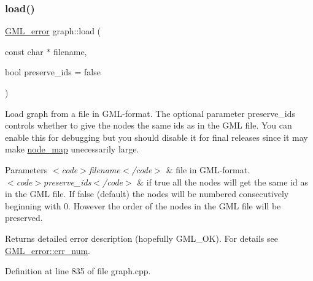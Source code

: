 \subsubsection{\texorpdfstring{load()}{load()}\hspace{0.1cm}{\footnotesize\ttfamily [2/2]}}
{\footnotesize\ttfamily \mbox{\hyperlink{struct_g_m_l__error}{G\+M\+L\+\_\+error}} graph\+::load (\begin{DoxyParamCaption}\item[{const char $\ast$}]{filename,  }\item[{bool}]{preserve\+\_\+ids = {\ttfamily false} }\end{DoxyParamCaption})\hspace{0.3cm}{\ttfamily [inherited]}}

Load graph from a file in G\+M\+L-\/format. The optional parameter {\ttfamily preserve\+\_\+ids} controls whether to give the nodes the same ids as in the G\+ML file. You can enable this for debugging but you should disable it for final releases since it may make {\ttfamily \mbox{\hyperlink{classnode__map}{node\+\_\+map}}} unecessarily large. ~\newline
 
\begin{DoxyParams}{Parameters}
{\em $<$code$>$filename$<$/code$>$} & file in G\+M\+L-\/format. \\
\hline
{\em $<$code$>$preserve\+\_\+ids$<$/code$>$} & if true all the nodes will get the same id as in the G\+ML file. If false (default) the nodes will be numbered consecutively beginning with 0. However the order of the nodes in the G\+ML file will be preserved. \\
\hline
\end{DoxyParams}
\begin{DoxyReturn}{Returns}
detailed error description (hopefully G\+M\+L\+\_\+\+OK). For details see \mbox{\hyperlink{struct_g_m_l__error_a66fe2c5a3d2d40e77ff486007dfe7f76}{G\+M\+L\+\_\+error\+::err\+\_\+num}}. 
\end{DoxyReturn}


Definition at line 835 of file graph.\+cpp.


